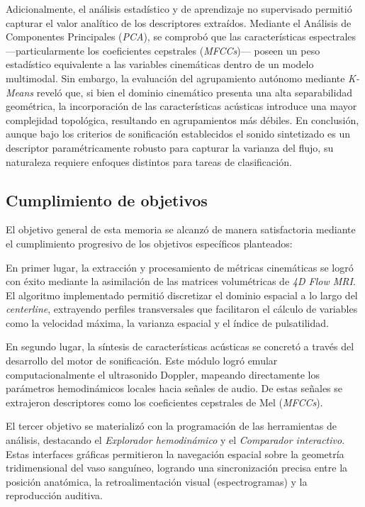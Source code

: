 Adicionalmente, el análisis estadístico y de aprendizaje no supervisado permitió capturar el valor analítico de los descriptores extraídos. Mediante el Análisis de Componentes Principales (\textit{PCA}), se comprobó que las características espectrales —particularmente los coeficientes cepstrales (\textit{MFCCs})— poseen un peso estadístico equivalente a las variables cinemáticas dentro de un modelo multimodal. Sin embargo, la evaluación del agrupamiento autónomo mediante \textit{K-Means} reveló que, si bien el dominio cinemático presenta una alta separabilidad geométrica, la incorporación de las características acústicas introduce una mayor complejidad topológica, resultando en agrupamientos más débiles. En conclusión, aunque bajo los criterios de sonificación establecidos el sonido sintetizado es un descriptor paramétricamente robusto para capturar la varianza del flujo, su naturaleza requiere enfoques distintos para tareas de clasificación.

\subsection{Cumplimiento de objetivos}

El objetivo general de esta memoria se alcanzó de manera satisfactoria mediante el cumplimiento progresivo de los objetivos específicos planteados:

En primer lugar, la extracción y procesamiento de métricas cinemáticas se logró con éxito mediante la asimilación de las matrices volumétricas de \textit{4D Flow MRI}. El algoritmo implementado permitió discretizar el dominio espacial a lo largo del \textit{centerline}, extrayendo perfiles transversales que facilitaron el cálculo de variables como la velocidad máxima, la varianza espacial y el índice de pulsatilidad.

En segundo lugar, la síntesis de características acústicas se concretó a través del desarrollo del motor de sonificación. Este módulo logró emular computacionalmente el ultrasonido Doppler, mapeando directamente los parámetros hemodinámicos locales hacia señales de audio. De estas señales se extrajeron descriptores como los coeficientes cepstrales de Mel (\textit{MFCCs}).

El tercer objetivo se materializó con la programación de las herramientas de análisis, destacando el \textit{Explorador hemodinámico} y el \textit{Comparador interactivo}. Estas interfaces gráficas permitieron la navegación espacial sobre la geometría tridimensional del vaso sanguíneo, logrando una sincronización precisa entre la posición anatómica, la retroalimentación visual (espectrogramas) y la reproducción auditiva.

